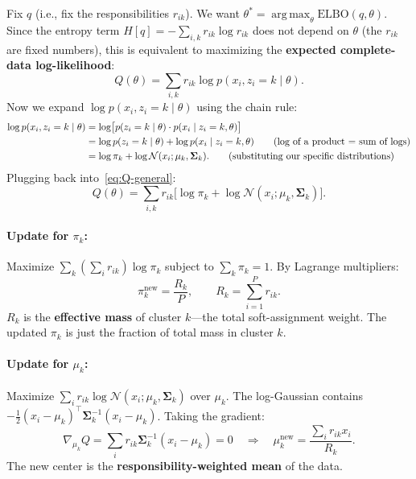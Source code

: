 \documentclass[11pt]{article}
\theoremstyle{definition}
\theoremstyle{plain}
\theoremstyle{remark}
\newcommand{\Sv}{\boldsymbol{\Sigma}}
\DeclareMathOperator*{\argmax}{arg\,max}
\begin{document}
Fix $q$ (i.e., fix the responsibilities $r_{ik}$). We want $\theta^*=\argmax_\theta \mathrm{ELBO}(q,\theta)$. Since the entropy term $H[q]=-\sum_{i,k}r_{ik}\log r_{ik}$ does not depend on $\theta$ (the $r_{ik}$ are fixed numbers), this is equivalent to maximizing the \textbf{expected complete-data log-likelihood}:
\begin{equation}
  Q(\theta) = \sum_{i,k} r_{ik}\log p(x_i,z_i=k\mid\theta).
  \label{eq:Q-general}
\end{equation}
Now we expand $\log p(x_i,z_i=k\mid\theta)$ using the chain rule:
\begin{align}
  \log p(x_i,z_i=k\mid\theta) &= \log\bigl[p(z_i=k\mid\theta)\cdot p(x_i\mid z_i=k,\theta)\bigr] \notag \\
  &= \log p(z_i=k\mid\theta) + \log p(x_i\mid z_i=k,\theta) \qquad\text{(log of a product = sum of logs)} \notag \\
  &= \log\pi_k + \log\mathcal{N}(x_i;\mu_k,\Sv_k). \qquad\text{(substituting our specific distributions)}
\end{align}
Plugging back into~\eqref{eq:Q-general}:
\begin{equation}
  Q(\theta) = \sum_{i,k} r_{ik}\bigl[\log\pi_k + \log\mathcal{N}(x_i;\mu_k,\Sv_k)\bigr].
\end{equation}

\paragraph{Update for $\pi_k$:} Maximize $\sum_k(\sum_i r_{ik})\log\pi_k$ subject to $\sum_k\pi_k=1$. By Lagrange multipliers:
\begin{equation}
  \pi_k^{\mathrm{new}} = \frac{R_k}{P}, \qquad R_k = \sum_{i=1}^P r_{ik}.
\end{equation}
$R_k$ is the \textbf{effective mass} of cluster $k$---the total soft-assignment weight. The updated $\pi_k$ is just the fraction of total mass in cluster $k$.

\paragraph{Update for $\mu_k$:} Maximize $\sum_i r_{ik}\log\mathcal{N}(x_i;\mu_k,\Sv_k)$ over $\mu_k$. The log-Gaussian contains $-\frac{1}{2}(x_i-\mu_k)^\top\Sv_k^{-1}(x_i-\mu_k)$. Taking the gradient:
\begin{equation}
  \nabla_{\mu_k}Q = \sum_i r_{ik}\Sv_k^{-1}(x_i-\mu_k) = 0 \quad\Longrightarrow\quad \mu_k^{\mathrm{new}} = \frac{\sum_i r_{ik}x_i}{R_k}.
\end{equation}
The new center is the \textbf{responsibility-weighted mean} of the data.
\end{document}
